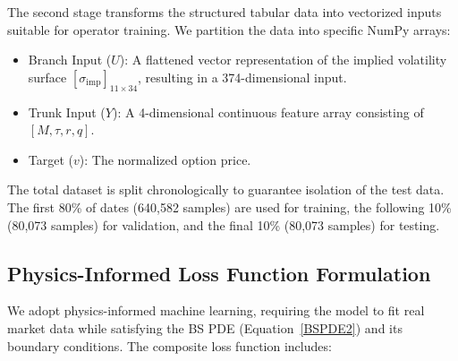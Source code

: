 \documentclass[a4paper,fleqn]{cas-sc}
\begin{document}
The second stage transforms the structured tabular data into vectorized inputs suitable for operator training. We partition the data into specific NumPy arrays:
\begin{itemize}[nosep]
    \item {Branch Input ($U$):} A flattened vector representation of the implied volatility surface $[\sigma_{\text{imp}}]_{11\times34}$, resulting in a 374-dimensional input.
    \item {Trunk Input ($Y$):} A 4-dimensional continuous feature array consisting of $[M, \tau, r, q]$.
    \item {Target ($v$):} The normalized option price.
\end{itemize}

The total dataset is split chronologically to guarantee isolation of the test data. The first 80\% of dates (640,582 samples) are used for training, the following 10\% (80,073 samples) for validation, and the final 10\% (80,073 samples) for testing.

\vspace{-5pt}\subsection{Physics-Informed Loss Function Formulation}
We adopt physics-informed machine learning, requiring the model to fit real market data while satisfying the BS PDE (Equation~\ref{BSPDE2}) and its boundary conditions. The composite loss function includes:
\end{document}
